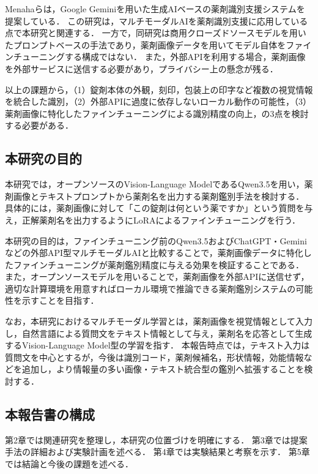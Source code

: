 \documentclass{ltjsarticle}
\begin{document}
Menahaら\cite{gemini2024pill}は，Google Geminiを用いた生成AIベースの薬剤識別支援システムを提案している．
この研究は，マルチモーダルAIを薬剤識別支援に応用している点で本研究と関連する．
一方で，同研究は商用クローズドソースモデルを用いたプロンプトベースの手法であり，薬剤画像データを用いてモデル自体をファインチューニングする構成ではない．
また，外部APIを利用する場合，薬剤画像を外部サービスに送信する必要があり，プライバシー上の懸念が残る．

以上の課題から，（1）錠剤本体の外観，刻印，包装上の印字など複数の視覚情報を統合した識別，（2）外部APIに過度に依存しないローカル動作の可能性，（3）薬剤画像に特化したファインチューニングによる識別精度の向上，の3点を検討する必要がある．

\subsection{本研究の目的}

本研究では，オープンソースのVision-Language ModelであるQwen3.5を用い，薬剤画像とテキストプロンプトから薬剤名を出力する薬剤鑑別手法を検討する．
具体的には，薬剤画像に対して「この錠剤は何という薬ですか」という質問を与え，正解薬剤名を出力するようにLoRAによるファインチューニングを行う．

本研究の目的は，ファインチューニング前のQwen3.5およびChatGPT・Geminiなどの外部API型マルチモーダルAIと比較することで，薬剤画像データに特化したファインチューニングが薬剤鑑別精度に与える効果を検証することである．
また，オープンソースモデルを用いることで，薬剤画像を外部APIに送信せず，適切な計算環境を用意すればローカル環境で推論できる薬剤鑑別システムの可能性を示すことを目指す．

なお，本研究におけるマルチモーダル学習とは，薬剤画像を視覚情報として入力し，自然言語による質問文をテキスト情報として与え，薬剤名を応答として生成するVision-Language Model型の学習を指す．
本報告時点では，テキスト入力は質問文を中心とするが，今後は識別コード，薬剤候補名，形状情報，効能情報などを追加し，より情報量の多い画像・テキスト統合型の鑑別へ拡張することを検討する．

\subsection{本報告書の構成}

第2章では関連研究を整理し，本研究の位置づけを明確にする．
第3章では提案手法の詳細および実験計画を述べる．
第4章では実験結果と考察を示す．
第5章では結論と今後の課題を述べる．

\newpage
\end{document}

